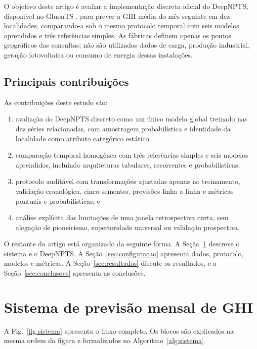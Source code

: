 \documentclass[10pt,conference,a4paper]{IEEEtran}
\begin{document}
O objetivo deste artigo é avaliar a implementação discreta oficial do
DeepNPTS, disponível no GluonTS \cite{alexandrov2020}, para prever a GHI média
do mês seguinte em dez localidades, comparando-a sob o mesmo protocolo temporal
com seis modelos aprendidos e três referências simples. As fábricas definem
apenas os pontos geográficos das consultas; não são utilizados dados de carga,
produção industrial, geração fotovoltaica ou consumo de energia dessas
instalações.

\subsection{Principais contribuições}

As contribuições deste estudo são:

\begin{enumerate}
  \item avaliação do DeepNPTS discreto como um único modelo global treinado nas
  dez séries relacionadas, com amostragem probabilística e identidade da
  localidade como atributo categórico estático;
  \item comparação temporal homogênea com três referências simples e seis
  modelos aprendidos, incluindo arquiteturas tabulares, recorrentes e
  probabilísticas;
  \item protocolo auditável com transformações ajustadas apenas no treinamento,
  validação cronológica, cinco sementes, previsões linha a linha e métricas
  pontuais e probabilísticas; e
  \item análise explícita das limitações de uma janela retrospectiva curta, sem
  alegação de pioneirismo, superioridade universal ou validação prospectiva.
\end{enumerate}

O restante do artigo está organizado da seguinte forma. A
Seção~\ref{sec:sistema} descreve o sistema e o DeepNPTS. A
Seção~\ref{sec:configuracao} apresenta dados, protocolo, modelos e métricas. A
Seção~\ref{sec:resultados} discute os resultados, e a
Seção~\ref{sec:conclusoes} apresenta as conclusões.

\section{Sistema de previsão mensal de GHI}
\label{sec:sistema}

A Fig.~\ref{fig:sistema} apresenta o fluxo completo. Os blocos são explicados
na mesma ordem da figura e formalizados no Algoritmo~\ref{alg:sistema}.
\end{document}
